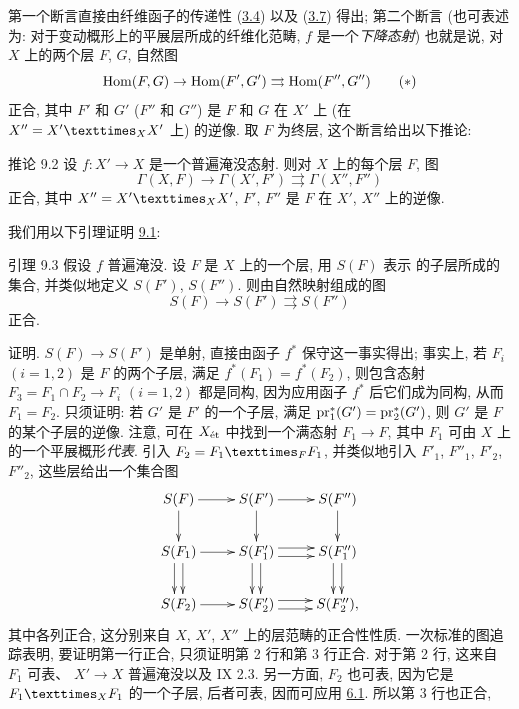 第一个断言直接由纤维函子的传递性
(\hyperref[VIII.subsec3.4]{3.4}) 以及 (\hyperref[VIII.cor3.7]{3.7}) 得出;
第二个断言 (也可表述为: 对于变动概形上的平展层所成的纤维化范畴,
$f$ 是一个\emph{下降态射})
也就是说, 对 $X$ 上的两个层 $F$, $G$, 自然图
\begin{equation*}
\operatorname{Hom}(F,G)\rightarrow \operatorname{Hom} (F',G')\rightrightarrows \operatorname{Hom} (F'',G'')\tag{$\ast$}
\end{equation*}
正合, 其中 $F'$ 和 $G'$ (\resp $F''$ 和 $G''$)
是 $F$ 和 $G$ 在 $X'$ 上
(\resp 在 $X''=\fprod{X'}{X'}{X}$ 上) 的逆像.
取 $F$ 为终层, 这个断言给出以下推论:

\begin{enonce*}{推论 9.2}
设 $f:X'\rightarrow X$ 是一个普遍淹没态射.
则对 $X$ 上的每个层 $F$, 图
$$
\Gamma(X,F)\rightarrow \Gamma(X',F')\rightrightarrows \Gamma(X'',F'')
$$
正合, 其中 $X''=\fprod{X'}{X'}{X}$,
$F'$, $F''$ 是 $F$ 在 $X'$, $X''$ 上的逆像.
\end{enonce*}

我们用以下引理证明 \hyperref[VIII.prop9.1]{9.1}:

\begin{enonce*}{引理 9.3}
假设 $f$ 普遍淹没.
设 $F$ 是 $X$ 上的一个层,
用 $S(F)$ 表示  的子层所成的集合,\pageoriginale
并类似地定义 $S(F')$, $S(F'')$.
则由自然映射组成的图
$$
S(F)\rightarrow S(F')\rightrightarrows S(F'')
$$
正合.
\end{enonce*}

\noindent
证明. $S(F)\rightarrow S(F')$ 是单射,
直接由函子 $f^{\ast}$ 保守这一事实得出;
事实上, 若 $F_i$ $(i=1,2)$ 是 $F$ 的两个子层,
满足 $f^{\ast}(F_{1})=f^{\ast}(F_{2})$,
则包含态射 $F_{3}=F_{1}\cap F_{2}\rightarrow F_{i}$ $(i=1,2)$ 都是同构,
因为应用函子 $f^{\ast}$ 后它们成为同构, 从而 $F_{1}=F_{2}$.
只须证明: 若 $G'$ 是 $F'$ 的一个子层,
满足 $\operatorname{pr}^{\ast}_{1}(G')=\operatorname{pr}^{\ast}_{2}(G')$,
则 $G'$ 是 $F$ 的某个子层的逆像.
注意, 可在 $X_{\text{\rm ét}}$ 中找到一个满态射 $F_{1}\rightarrow F$,
其中 $F_{1}$ 可由 $X$ 上的一个平展概形\emph{代表}.
引入 $F_{2}=\fprod{F_{1}}{F_{1}}{F}$,
并类似地引入 $F'_{1}$, $F''_{1}$, $F'_{2}$, $F''_{2}$,
这些层给出一个集合图
\[
\xymatrix@R=.75cm{
  S(F)  \ar[r] \ar[d]& S(F') \ar[r]\ar[d] & S(F'') \ar[d]\\
S(F_1) \ar[r] \ar@<3pt>[d] \ar@<-3pt>[d]& S(F'_1) \ar@<3pt>[r]
  \ar@<-3pt>[r] \ar@<3pt>[d] \ar@<-3pt>[d]& S(F''_{1})\ar@<3pt>[d] \ar@<-3pt>[d] \\
S(F_2)  \ar[r] & S(F'_2)\ar@<3pt>[r]
  \ar@<-3pt>[r] & S(F''_2),
}
\]
其中各列正合, 这分别来自 $X$, $X'$, $X''$ 上的层范畴的正合性性质.
一次标准的图追踪表明,
要证明第一行正合, 只须证明第 2 行和第 3 行正合.
对于第 2 行, 这来自 $F_{1}$ 可表、
$X'\rightarrow X$ 普遍\pageoriginale 淹没以及 \SGA{} IX 2.3.
另一方面, $F_{2}$ 也可表,
因为它是 $\fprod{F_{1}}{F_{1}}{X}$ 的一个子层,
后者可表, 因而可应用 \hyperref[VIII.prop6.1]{6.1}.
所以第 3 行也正合, \cqfd

